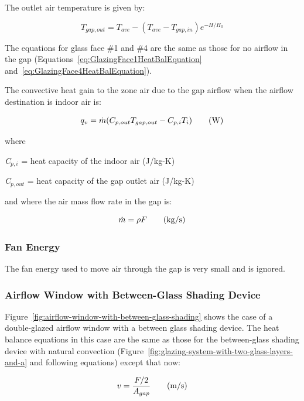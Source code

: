 The outlet air temperature is given by:

\begin{equation}
{T_{gap,out}} = {T_{ave}} - ({T_{ave}} - {T_{gap,in}}){e^{ - H/{H_0}}}
\end{equation}

The equations for glass face \#1 and \#4 are the same as those for no airflow in the gap (Equations~\ref{eq:GlazingFace1HeatBalEquation} and~\ref{eq:GlazingFace4HeatBalEquation}).

The convective heat gain to the zone air due to the gap airflow when the airflow destination is indoor air is:

\begin{equation}
{q_v} = \dot m({C_{p,out}}{T_{gap,out}} - {C_{p,i}}{T_i}){\rm{~~~~~~(W)}}
\end{equation}

where

\emph{C\(_{p,i}\)} = heat capacity of the indoor air (J/kg-K)

\emph{C\(_{p,out}\)} = heat capacity of the gap outlet air (J/kg-K)

and where the air mass flow rate in the gap is:

\begin{equation}
\dot m = \rho F{\rm{~~~~~~(kg/s)}}
\end{equation}

\subsubsection{Fan Energy}\label{fan-energy}

The fan energy used to move air through the gap is very small and is ignored.

\subsubsection{Airflow Window with Between-Glass Shading Device}\label{airflow-window-with-between-glass-shading-device}

Figure~\ref{fig:airflow-window-with-between-glass-shading} shows the case of a double-glazed airflow window with a between glass shading device. The heat balance equations in this case are the same as those for the between-glass shading device with natural convection (Figure~\ref{fig:glazing-system-with-two-glass-layers-and-a} and following equations) except that now:

\begin{equation}
v = \frac{{F/2}}{{{A_{gap}}}}{\rm{~~~~~~(m/s)}}
\end{equation}

